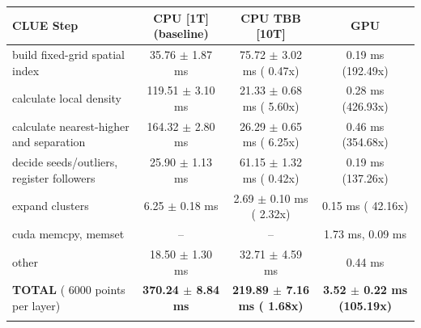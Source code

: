     \begin{tabular}{l|c|c|c}
    \hline
    CLUE Step                                 & CPU [1T] (baseline)         & CPU TBB [10T]                         & GPU                       \\ \hline
    build fixed-grid spatial index            &  35.76 $\pm$  1.87 ms       &  75.72 $\pm$  3.02 ms ( 0.47x)        &   0.19 ms (192.49x)       \\
    calculate local density                   & 119.51 $\pm$  3.10 ms       &  21.33 $\pm$  0.68 ms ( 5.60x)        &   0.28 ms (426.93x)       \\
    calculate nearest-higher and separation   & 164.32 $\pm$  2.80 ms       &  26.29 $\pm$  0.65 ms ( 6.25x)        &   0.46 ms (354.68x)       \\
    decide seeds/outliers, register followers &  25.90 $\pm$  1.13 ms       &  61.15 $\pm$  1.32 ms ( 0.42x)        &   0.19 ms (137.26x)       \\
    expand clusters                           &   6.25 $\pm$  0.18 ms       &   2.69 $\pm$  0.10 ms ( 2.32x)        &   0.15 ms ( 42.16x)       \\ \hline
    cuda memcpy, memset                       & --                          & --                                    &   1.73 ms,   0.09 ms      \\
    other                                     &  18.50 $\pm$  1.30 ms       &  32.71 $\pm$  4.59 ms                 &   0.44 ms                 \\ \hline
    \textbf{TOTAL} ( 6000 points per layer)   & \textbf{370.24 $\pm$  8.84 ms} & \textbf{219.89 $\pm$  7.16 ms ( 1.68x)} & \textbf{  3.52 $\pm$  0.22 ms (105.19x)}  \\
    \hline
    \multicolumn{4}{c}{}
    \end{tabular}
    \linebreak


